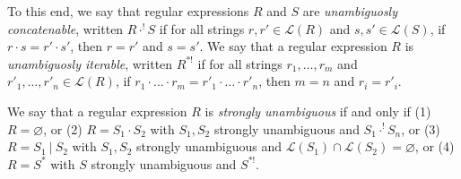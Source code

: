 \documentclass{svproc}
\newcommand{\sep}{\ensuremath{\ | \ }}
\begin{document}
To this end, we say that regular expressions $R$ and $S$ are
\textit{unambiguosly concatenable}, written $R \cdot^! S$ if for all strings
$r, r' \in \mathcal{L}(R)$ and $s, s' \in \mathcal{L}(S)$, if $r \cdot s = r'
\cdot s'$, then $r = r'$ and $s = s'$. We say that a regular expression $R$ is
\textit{unambiguosly iterable}, written $R^{*!}$ if for all strings $r_1,
\ldots, r_m$ and $r'_1, \ldots, r'_n \in \mathcal{L}(R)$, if $r_1 \cdot \ldots
\cdot r_m = r'_1 \cdot \ldots \cdot r'_n$, then $m = n$ and $r_i = r'_i$.

We say that a regular expression $R$ is \textit{strongly unambiguous} if and
only if (1) $R = \varnothing$, or (2) $R = S_1 \cdot S_2$ with $S_1, S_2$
strongly unambiguous and $S_1 \cdot^! S_n$, or (3) $R = S_1 \sep S_2$ with
$S_1, S_2$ strongly unambiguous and $\mathcal{L}(S_1) \cap \mathcal{L}(S_2) =
\varnothing$, or (4) $R = S^*$ with $S$ strongly unambiguous and $S^{*!}$.
\end{document}
